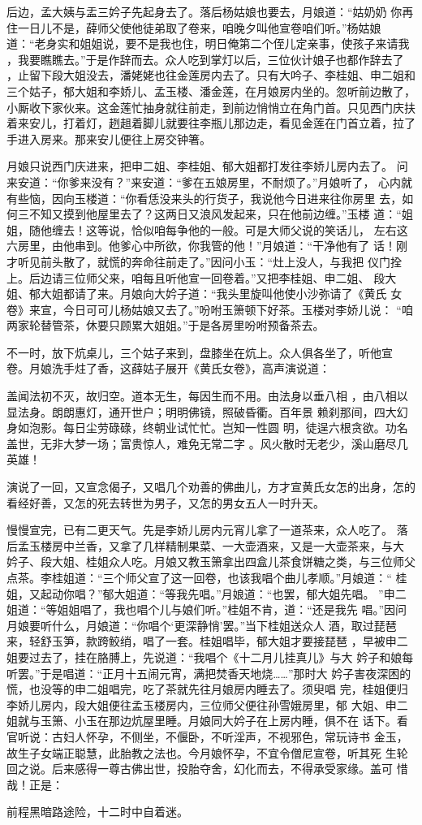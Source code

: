 后边，孟大姨与盂三妗子先起身去了。落后杨姑娘也要去，月娘道：“姑奶奶
你再住一日儿不是，薛师父使他徒弟取了卷来，咱晚夕叫他宣卷咱们听。”杨姑娘
道：“老身实和姐姐说，要不是我也住，明日俺第二个侄儿定亲事，使孩子来请我
，我要瞧瞧去。”于是作辞而去。众人吃到掌灯以后，三位伙计娘子也都作辞去了
，止留下段大姐没去，潘姥姥也往金莲房内去了。只有大吟子、李桂姐、申二姐和
三个姑子，郁大姐和李娇儿、孟玉楼、潘金莲，在月娘房内坐的。忽听前边散了，
小厮收下家伙来。这金莲忙抽身就往前走，到前边悄悄立在角门首。只见西门庆扶
着来安儿，打着灯，趔趄着脚儿就要往李瓶儿那边走，看见金莲在门首立着，拉了
手进入房来。那来安儿便往上房交钟箸。

月娘只说西门庆进来，把申二姐、李桂姐、郁大姐都打发往李娇儿房内去了。
问来安道：“你爹来没有？”来安道：“爹在五娘房里，不耐烦了。”月娘听了，
心内就有些恼，因向玉楼道：“你看恁没来头的行货子，我说他今日进来往你房里
去，如何三不知又摸到他屋里去了？这两日又浪风发起来，只在他前边缠。”玉楼
道：“姐姐，随他缠去！这等说，恰似咱每争他的一般。可是大师父说的笑话儿，
左右这六房里，由他串到。他爹心中所欲，你我管的他！”月娘道：“干净他有了
话！刚才听见前头散了，就慌的奔命往前走了。”因问小玉：“灶上没人，与我把
仪门拴上。后边请三位师父来，咱每且听他宣一回卷着。”又把李桂姐、申二姐、
段大姐、郁大姐都请了来。月娘向大妗子道：“我头里旋叫他使小沙弥请了《黄氏
女卷》来宣，今日可可儿杨姑娘又去了。”吩咐玉箫顿下好茶。玉楼对李娇儿说：
“咱两家轮替管茶，休要只顾累大姐姐。”于是各房里吩咐预备茶去。

不一时，放下炕桌儿，三个姑子来到，盘膝坐在炕上。众人俱各坐了，听他宣
卷。月娘洗手炷了香，这薛姑子展开《黄氏女卷》，高声演说道：

盖闻法初不灭，故归空。道本无生，每因生而不用。由法身以垂八相
，由八相以显法身。朗朗惠灯，通开世户；明明佛镜，照破昏衢。百年景
赖刹那间，四大幻身如泡影。每日尘劳碌碌，终朝业试忙忙。岂知一性圆
明，徒逞六根贪欲。功名盖世，无非大梦一场；富贵惊人，难免无常二字
。风火散时无老少，溪山磨尽几英雄！

演说了一回，又宣念偈子，又唱几个劝善的佛曲儿，方才宣黄氏女怎的出身，怎的
看经好善，又怎的死去转世为男子，又怎的男女五人一时升天。

慢慢宣完，已有二更天气。先是李娇儿房内元宵儿拿了一道茶来，众人吃了。
落后孟玉楼房中兰香，又拿了几样精制果菜、一大壶酒来，又是一大壶茶来，与大
妗子、段大姐、桂姐众人吃。月娘又教玉箫拿出四盒儿茶食饼糖之类，与三位师父
点茶。李桂姐道：“三个师父宣了这一回卷，也该我唱个曲儿孝顺。”月娘道：“
桂姐，又起动你唱？”郁大姐道：“等我先唱。”月娘道：“也罢，郁大姐先唱。
”申二姐道：“等姐姐唱了，我也唱个儿与娘们听。”桂姐不肯，道：“还是我先
唱。”因问月娘要听什么，月娘道：“你唱个‘更深静悄’罢。”当下桂姐送众人
酒，取过琵琶来，轻舒玉笋，款跨鲛绡，唱了一套。桂姐唱毕，郁大姐才要接琵琶
，早被申二姐要过去了，挂在胳膊上，先说道：“我唱个《十二月儿挂真儿》与大
妗子和娘每听罢。”于是唱道：“正月十五闹元宵，满把焚香天地烧……”那时大
妗子害夜深困的慌，也没等的申二姐唱完，吃了茶就先往月娘房内睡去了。须臾唱
完，桂姐便归李娇儿房内，段大姐便往孟玉楼房内，三位师父便往孙雪娥房里，郁
大姐、申二姐就与玉箫、小玉在那边炕屋里睡。月娘同大妗子在上房内睡，俱不在
话下。看官听说：古妇人怀孕，不侧坐，不偃卧，不听淫声，不视邪色，常玩诗书
金玉，故生子女端正聪慧，此胎教之法也。今月娘怀孕，不宜令僧尼宣卷，听其死
生轮回之说。后来感得一尊古佛出世，投胎夺舍，幻化而去，不得承受家缘。盖可
惜哉！正是：

前程黑暗路途险，十二时中自着迷。